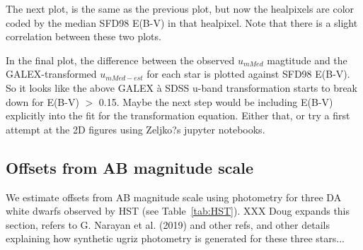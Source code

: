 The next plot,
is the same as the previous plot, but now the healpixels are color coded by the median SFD98 E(B-V) in that healpixel.
Note that there is a slight correlation between these two plots.
 
In the final plot,
the difference between the observed $u_{mMed}$ magtitude and the GALEX-transformed $u_{mMed-est}$ for each star is plotted against SFD98 E(B-V).    So it looks like the above GALEX à SDSS u-band transformation starts to break down for E(B-V) $>$ 0.15.  Maybe the next step would be including E(B-V) explicitly into the fit for the transformation equation.  Either that, or try a first attempt at the 2D figures using Zeljko?s jupyter notebooks.


\subsection{Offsets from AB magnitude scale \label{sec:AB}} 

We estimate offsets from AB magnitude scale using photometry for three DA white dwarfs observed by HST
(see Table~\ref{tab:HST}). XXX Doug expands this section, refers to G. Narayan et al. (2019) and other refs,
and other details explaining how synthetic ugriz photometry is generated for these three stars...


